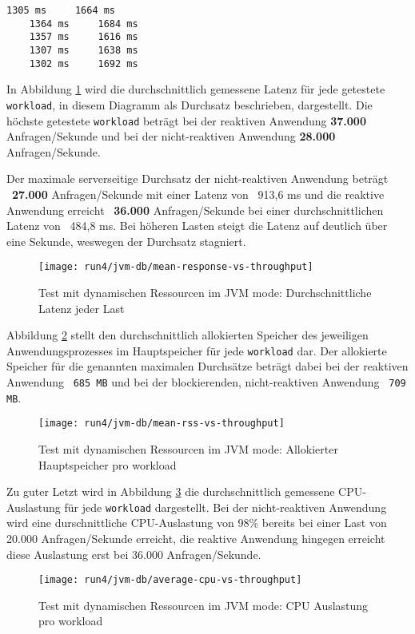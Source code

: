 \begin{lstlisting}[caption=5 gemessene Startzeiten bis zur Bearbeitung der ersten Anfrage als JVM-Anwendungen: links ist die reaktive
     Anwendung und rechts die blockierende Anwendung, captionpos=b, label=lst:starttimes_jvm_dynamic]
    1305 ms     1664 ms
    1364 ms     1684 ms
    1357 ms     1616 ms
    1307 ms     1638 ms
    1302 ms     1692 ms
\end{lstlisting}

In Abbildung \ref{fig:jvm_dynamic_mean_response} wird die durchschnittlich gemessene Latenz für jede getestete \verb|workload|,
in diesem Diagramm als Durchsatz beschrieben, dargestellt.
Die höchste getestete \verb|workload| beträgt bei der reaktiven Anwendung \textbf{37.000} Anfragen/Sekunde und bei der
nicht-reaktiven Anwendung \textbf{28.000} Anfragen/Sekunde.

Der maximale serverseitige Durchsatz der nicht-reaktiven Anwendung beträgt ~\textbf{27.000} Anfragen/Sekunde mit einer
Latenz von ~913,6 ms und
die reaktive Anwendung erreicht ~\textbf{36.000} Anfragen/Sekunde bei einer durchschnittlichen Latenz von ~484,8 ms.
Bei höheren Lasten steigt die Latenz auf deutlich über eine Sekunde, weswegen der Durchsatz stagniert.
\newpage
\begin{figure}[ht!]
    \centering
    \texttt{[image: run4/jvm-db/mean-response-vs-throughput]}
    \caption{Test mit dynamischen Ressourcen im JVM mode: Durchschnittliche Latenz jeder Last}
    \label{fig:jvm_dynamic_mean_response}
\end{figure}
Abbildung \ref{fig:jvm_dynamic_mean_rss} stellt den durchschnittlich allokierten Speicher des jeweiligen Anwendungsprozesses
im Hauptspeicher für jede \verb|workload| dar. Der allokierte Speicher für die genannten maximalen Durchsätze beträgt dabei bei
der reaktiven Anwendung ~\verb|685 MB| und bei der blockierenden, nicht-reaktiven Anwendung ~\verb|709 MB|.
\newpage
\begin{figure}[ht!]
    \centering
    \texttt{[image: run4/jvm-db/mean-rss-vs-throughput]}
    \caption{Test mit dynamischen Ressourcen im JVM mode: Allokierter Hauptspeicher pro workload}
    \label{fig:jvm_dynamic_mean_rss}
\end{figure}

Zu guter Letzt wird in Abbildung \ref{fig:jvm_dynamic_avg_cpu} die durchschnittlich gemessene CPU-Auslastung für jede \verb|workload|
dargestellt. Bei der nicht-reaktiven Anwendung wird eine durschnittliche CPU-Auslastung von 98\% bereits bei einer Last von
20.000 Anfragen/Sekunde erreicht, die reaktive Anwendung hingegen erreicht diese Auslastung erst bei 36.000 Anfragen/Sekunde.
\newpage
\begin{figure}[ht!]
    \centering
    \texttt{[image: run4/jvm-db/average-cpu-vs-throughput]}
    \caption{Test mit dynamischen Ressourcen im JVM mode: CPU Auslastung pro workload}
    \label{fig:jvm_dynamic_avg_cpu}
\end{figure}

